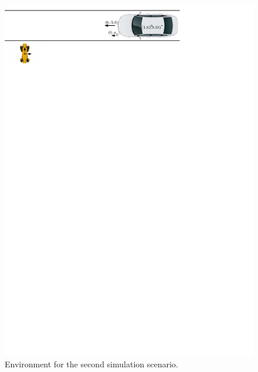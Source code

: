         \\
            \begin{figure}[ht]
                \centering
                \includegraphics[width=\linewidth]{images/simulations/scene2.pdf}
                \caption{Environment for the second simulation scenario.}
                \label{fig:scene2}
            \end{figure}
